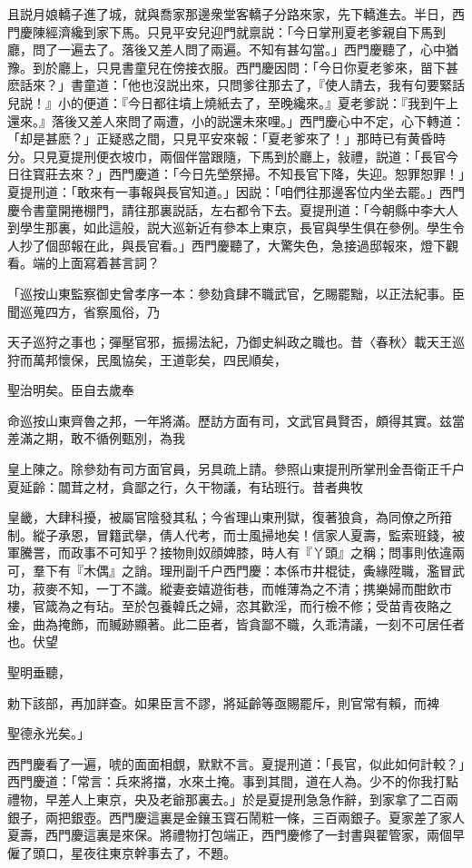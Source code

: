 且説月娘轎子進了城，就與喬家那邊衆堂客轎子分路來家，先下轎進去。半日，西門慶陳經濟纔到家下馬。只見平安兒迎門就禀説：「今日掌刑夏老爹親自下馬到廳，問了一遍去了。落後又差人問了兩遍。不知有甚勾當。」西門慶聽了，心中猶豫。到於廳上，只見書童兒在傍接衣服。西門慶因問：「今日你夏老爹來，㽞下甚麽話來？」書童道：「他也沒説出來，只問爹往那去了，『使人請去，我有句要緊話兒説！』小的便道：『今日都往墳上燒紙去了，至晚纔來。』夏老爹説：『我到午上還來。』落後又差人來問了兩遭，小的説還未來哩。」西門慶心中不定，心下轉道：「却是甚麽？」正疑惑之間，只見平安來報：「夏老爹來了！」那時已有黄昏時分。只見夏提刑便衣坡巾，兩個伴當跟隨，下馬到於廳上，敍禮，説道：「長官今日往寳莊去來？」西門慶道：「今日先塋祭掃。不知長官下降，失迎。恕罪恕罪！」夏提刑道：「敢來有一事報與長官知道。」因説：「咱們往那邊客位内坐去罷。」西門慶令書童開捲棚門，請往那裏説話，左右都令下去。夏提刑道：「今朝縣中李大人到學生那裏，如此這般，説大巡新近有參本上東京，長官與學生俱在參例。學生令人抄了個邸報在此，與長官看。」西門慶聽了，大驚失色，急接過邸報來，燈下觀看。端的上面寫着甚言詞？

「巡按山東監察御史曾孝序一本：參劾貪肆不職武官，乞賜罷黜，以正法紀事。臣聞巡蒐四方，省察風俗，乃

天子巡狩之事也；彈壓官邪，振揚法紀，乃御史糾政之職也。昔〈春秋〉載天王巡狩而萬邦懷保，民風協矣，王道彰矣，四民順矣，

聖治明矣。臣自去歲奉

命巡按山東齊魯之邦，一年將滿。歷訪方面有司，文武官員賢否，頗得其實。兹當差滿之期，敢不循例甄別，為我

皇上陳之。除參劾有司方面官員，另具疏上請。參照山東提刑所掌刑金吾衛正千户夏延齡：闒茸之材，貪鄙之行，久干物議，有玷班行。昔者典牧

皇畿，大肆科擾，被屬官陰發其私；今省理山東刑獄，復著狼貪，為同僚之所箝制。縱子承恩，冒籍武擧，倩人代考，而士風掃地矣！信家人夏壽，監索班錢，被軍騰詈，而政事不可知乎？接物則奴顔婢膝，時人有『丫頭』之稱；問事則依違兩可，羣下有『木偶』之誚。理刑副千户西門慶：本係市井棍徒，夤緣陞職，濫冒武功，菽麥不知，一丁不識。縱妻妾嬉遊街巷，而帷薄為之不清；携樂婦而酣飲市樓，官箴為之有玷。至於包養韓氏之婦，恣其歡淫，而行檢不修；受苗青夜賂之金，曲為掩飾，而贓跡顯著。此二臣者，皆貪鄙不職，久乖清議，一刻不可居任者也。伏望

聖明垂聽，

勅下該部，再加詳查。如果臣言不謬，將延齡等亟賜罷斥，則官常有賴，而裨

聖德永光矣。」

西門慶看了一遍，唬的面面相覷，默默不言。夏提刑道：「長官，似此如何計較？」西門慶道：「常言：兵來將擋，水來土掩。事到其間，道在人為。少不的你我打點禮物，早差人上東京，央及老爺那裏去。」於是夏提刑急急作辭，到家拿了二百兩銀子，兩把銀壺。西門慶這裏是金鑲玉寳石鬧粧一條，三百兩銀子。夏家差了家人夏壽，西門慶這裏是來保。將禮物打包端正，西門慶修了一封書與翟管家，兩個早僱了頭口，星夜往東京幹事去了，不題。

